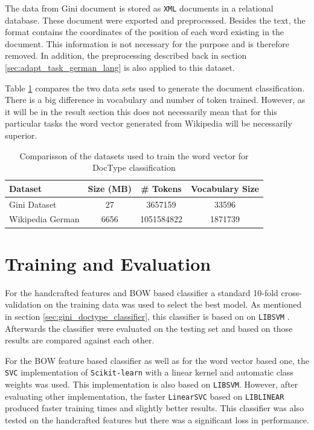 The data from Gini document is stored as \texttt{XML} documents in a
relational database. These document were exported and preprocessed. Besides
the text, the format contains the coordinates of the position of each word
existing in the document. This information is not necessary for the purpose
and is therefore removed. In addition, the preprocessing described back in
section \ref{sec:adapt_task_german_lang} is also applied to this dataset.

Table \ref{tab:w2v4tc_dataset_comparisson} compares the two data sets used
to generate the document classification. There is a big difference in
vocabulary and number of token trained. However, as it will be in the result
section this does not necessarily mean that for this particular tasks the
word vector generated from Wikipedia will be necessarily superior.

\begin{table}[h]

  \centering
  \caption{Comparisson of the datasets used to train the word vector for
    \ac{DocType} classification}
  \label{tab:w2v4tc_dataset_comparisson}

\small
\begin{tabular}{|l|c|c|c|}
\hline
Dataset           &  Size (MB)  &    \# Tokens  &  Vocabulary  Size  \\
\hline
 Gini Dataset      &         27  &     3657159  &             33596  \\
 Wikipedia German  &       6656  &  1051584822  &           1871739  \\
\hline
\end{tabular}

\end{table}


\section{Training and Evaluation}
\label{sec:w2v4tc_training-evaluation}

For the handcrafted features and \ac{BOW} based classifier a standard 10-fold
cross-validation  on the training data  was used to select the best model.
As mentioned in section \ref{sec:gini_doctype_classifier}, this classifier is
based on  on \texttt{LIBSVM} \cite{CC01a}.
Afterwards the classifier were evaluated on the testing set and based on
those results are compared against each other.

For the \ac{BOW} feature based classifier as well as for the word vector
based one, the  \texttt{SVC} implementation of  \texttt{Scikit-learn}
with a linear kernel and automatic class weights was used. This
implementation is also  based on \texttt{LIBSVM}. However, after evaluating
other implementation, the  faster \texttt{LinearSVC} based on \texttt{LIBLINEAR}
\cite{Fan:2008:LLL:1390681.1442794}  produced faster training times
and slightly better results. This classifier was also tested on the
handcrafted features but there was a significant loss in performance.


